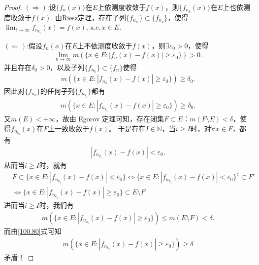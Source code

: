 \documentclass[../../main.tex]{subfiles}
\begin{document}
\begin{proof}
\((\Rightarrow)\):设$\{f_n(x)\}$在$E$上依测度收敛于$f(x)$，则$\{f_{n_k}(x)\}$在$E$上也依测度收敛于$f(x)$. 由\hyperref[theorem:Riesz定理]{Riesz定理}，存在子列\(\{f_{n_{k_i}}\} \subset \{f_{n_k}\}\)，使得$\lim_{i\to \infty}f_{n_{k_i}}(x)= f(x),\,\text{a.e.}\,x\in E.$

\((\Leftarrow)\):假设\(f_n(x)\)在\(E\)上不依测度收敛于\(f(x)\)，则\(\exists \varepsilon_0 > 0\)，使得
\begin{align*}
\underset{n\rightarrow \infty}{\lim}m(\{x\in E:|f_n(x)-f(x)|\geqslant \varepsilon _0\})>0.
\end{align*}
并且存在\(\delta_0 > 0\)，以及子列\(\{f_{n_k}\} \subset \{f_n\}\)使得
\begin{align*}
m(\{x \in E : |f_{n_k}(x) - f(x)| \geqslant \varepsilon_0\}) \geqslant \delta_0.
\end{align*}
因此对\(\{f_{n_k}\}\)的任何子列$\{f_{n_{k_i}}\}$都有
\begin{align}
m(\{x \in E : |f_{n_{k_i}}(x) - f(x)| \geqslant \varepsilon_0\}) \geqslant \delta_0.\label{100.80}
\end{align}
又\(m(E) < +\infty\)，故由 Egorov 定理可知，存在闭集\(F \subset E\)：\(m(F \setminus E) < \delta\)，使得\(f_{n_{k_i}}(x)\)在\(F\)上一致收敛于\(f(x)\)。
于是存在\(I \in \mathbb{N}\)，当\(i \geqslant I\)时，对\(\forall x \in F\)，都有
\begin{align*}
|f_{n_{k_i}}(x) - f(x)| < \varepsilon_0.
\end{align*}
从而当\(i \geqslant I\)时，就有
\begin{align*}
&F \subset \{x \in E : |f_{n_{k_i}}(x) - f(x)| < \varepsilon_0\} \Longleftrightarrow \{x \in E : |f_{n_{k_i}}(x) - f(x)| < \varepsilon_0\}^c \subset F^c \\
&\Longleftrightarrow \{x \in E : |f_{n_{k_i}}(x) - f(x)| \geqslant \varepsilon_0\} \subset E \setminus F.
\end{align*}
进而当\(i \geqslant I\)时，我们有
\begin{align*}
m(\{x \in E : |f_{n_{k_i}}(x) - f(x)| \geqslant \varepsilon_0\}) \leqslant m(E \setminus F) < \delta.
\end{align*}
而由\eqref{100.80}式可知
\begin{align*}
m(\{x \in E : |f_{n_{k_i}}(x) - f(x)| \geqslant \varepsilon_0\}) \geqslant \delta
\end{align*}
矛盾！
\end{proof}
\end{document}

